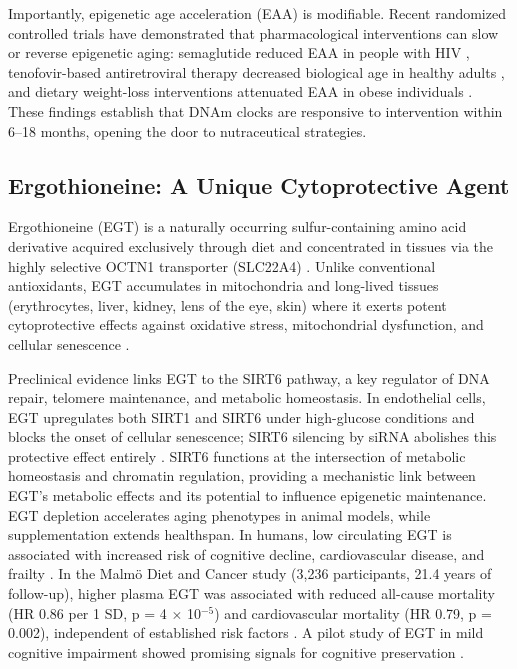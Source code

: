 \documentclass[11pt,a4paper]{article}
\begin{document}
Importantly, epigenetic age acceleration (EAA) is modifiable. Recent randomized controlled trials have demonstrated that pharmacological interventions can slow or reverse epigenetic aging: semaglutide reduced EAA in people with HIV \cite{corley2025}, tenofovir-based antiretroviral therapy decreased biological age in healthy adults \cite{anderson2026}, and dietary weight-loss interventions attenuated EAA in obese individuals \cite{kou2025}. These findings establish that DNAm clocks are responsive to intervention within 6--18 months, opening the door to nutraceutical strategies.

\subsection{Ergothioneine: A Unique Cytoprotective Agent}

Ergothioneine (EGT) is a naturally occurring sulfur-containing amino acid derivative acquired exclusively through diet and concentrated in tissues via the highly selective OCTN1 transporter (SLC22A4) \cite{cheah2012}. Unlike conventional antioxidants, EGT accumulates in mitochondria and long-lived tissues (erythrocytes, liver, kidney, lens of the eye, skin) where it exerts potent cytoprotective effects against oxidative stress, mitochondrial dysfunction, and cellular senescence \cite{gede2025}.

Preclinical evidence links EGT to the SIRT6 pathway, a key regulator of DNA repair, telomere maintenance, and metabolic homeostasis. In endothelial cells, EGT upregulates both SIRT1 and SIRT6 under high-glucose conditions and blocks the onset of cellular senescence; SIRT6 silencing by siRNA abolishes this protective effect entirely \cite{donofrio2016}. SIRT6 functions at the intersection of metabolic homeostasis and chromatin regulation, providing a mechanistic link between EGT's metabolic effects and its potential to influence epigenetic maintenance. EGT depletion accelerates aging phenotypes in animal models, while supplementation extends healthspan. In humans, low circulating EGT is associated with increased risk of cognitive decline, cardiovascular disease, and frailty \cite{yau2024,gallagher2023}. In the Malm{\"o} Diet and Cancer study (3,236 participants, 21.4 years of follow-up), higher plasma EGT was associated with reduced all-cause mortality (HR 0.86 per 1 SD, p = 4 $\times$ 10$^{-5}$) and cardiovascular mortality (HR 0.79, p = 0.002), independent of established risk factors \cite{smith2020}. A pilot study of EGT in mild cognitive impairment showed promising signals for cognitive preservation \cite{yau2024}.
\end{document}
